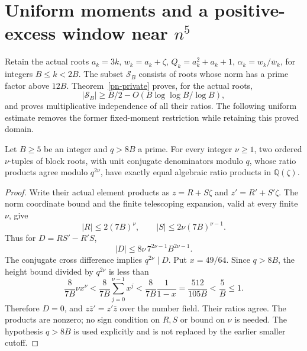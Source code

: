 \section{Uniform moments and a positive-excess window near \(n^5\)}
\label{um-section}

Retain the actual roots \(a_k=3k\), \(w_k=a_k+\zeta\),
\(Q_k=a_k^2+a_k+1\), \(\alpha_k=w_k/\bar w_k\), for integers
\(B\leq k<2B\). The subset \(\mathcal S_B\) consists of roots
whose norm has a prime factor above \(12B\).
Theorem~\ref{pn-private} proves, for the actual roots,
\[
 |\mathcal S_B|\geq B/2-O(B\log\log B/\log B),
\]
and proves multiplicative independence of all their ratios.
The following uniform estimate removes the former fixed-moment
restriction while retaining this proved domain.

\begin{lemma}\label{um-rigidity}
Let \(B\geq5\) be an integer and \(q>8B\) a prime.
For every integer \(\nu\geq1\), two ordered \(\nu\)-tuples of
block roots, with unit conjugate denominators modulo \(q\),
whose ratio products agree modulo \(q^{2\nu}\), have exactly
equal algebraic ratio products in \(\mathbb Q(\zeta)\).
\end{lemma}
\begin{proof}
Write their actual element products as \(z=R+S\zeta\) and
\(z'=R'+S'\zeta\).
The norm coordinate bound and the finite telescoping expansion,
valid at every finite \(\nu\), give
\[
 |R|\leq2(7B)^\nu,\qquad |S|\leq2\nu(7B)^{\nu-1}.
\]
Thus for \(D=RS'-R'S\),
\[
 |D|\leq8\nu\,7^{2\nu-1}B^{2\nu-1}.
\]
The conjugate cross difference implies \(q^{2\nu}\mid D\).
Put \(x=49/64\). Since \(q>8B\), the height bound divided by
\(q^{2\nu}\) is less than
\[
 \frac8{7B}\nu x^\nu
 <\frac8{7B}\sum_{j=0}^{\nu-1}x^j
 <\frac8{7B}\frac1{1-x}
 =\frac{512}{105B}<\frac5B\leq1.
\]
Therefore \(D=0\), and \(z\bar z'=z'\bar z\) over the number
field. Their ratios agree. The products are nonzero; no sign
condition on \(R,S\) or bound on \(\nu\) is needed.
The hypothesis \(q>8B\) is used explicitly and is not replaced
by the earlier smaller cutoff.
\end{proof}

